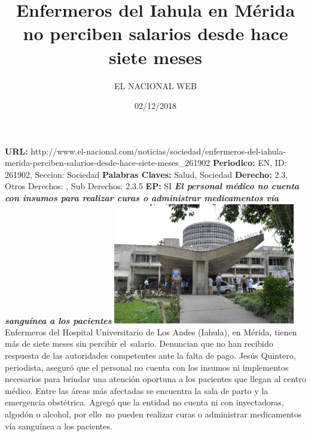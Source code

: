 \documentclass{article}%
\title{\textbf{Enfermeros del Iahula en Mérida no perciben salarios desde hace siete meses}}%
\author{EL NACIONAL WEB}%
\date{02/12/2018}%
\begin{document}
%
\normalsize%
\maketitle%
\textbf{URL: }%
http://www.el{-}nacional.com/noticias/sociedad/enfermeros{-}del{-}iahula{-}merida{-}perciben{-}salarios{-}desde{-}hace{-}siete{-}meses\_261902\newline%
%
\textbf{Periodico: }%
EN, %
ID: %
261902, %
Seccion: %
Sociedad\newline%
%
\textbf{Palabras Claves: }%
Salud, Sociedad\newline%
%
\textbf{Derecho: }%
2.3, %
Otros Derechos: %
, %
Sub Derechos: %
2.3.5\newline%
%
\textbf{EP: }%
SI\newline%
\newline%
%
\textbf{\textit{El personal médico no cuenta con insumos para realizar curas o administrar medicamentos vía sanguínea a los pacientes}}%
\newline%
\newline%
%
\includegraphics[width=300px]{73.jpg}%
\newline%
%
Enfermeros del Hospital Universitario de Los Andes (Iahula), en Mérida, tienen más de siete meses sin percibir el~salario. Denuncian que no han recibido respuesta de las autoridades competentes ante la falta de pago.%
\newline%
%
Jesús Quintero, periodista, aseguró que el personal no cuenta con los insumos ni implementos necesarios para brindar una atención oportuna a los pacientes que llegan al centro médico. Entre las áreas más afectadas se encuentra la sala de parto y la emergencia obstétrica.%
\newline%
%
Agregó que la entidad no cuenta ni con inyectadoras, algodón o alcohol, por ello~no pueden realizar curas o administrar medicamentos vía sanguínea a los pacientes.%
\newline%
%
\end{document}
